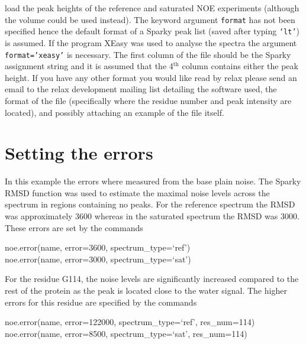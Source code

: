 load the peak heights of the reference and saturated NOE experiments (although the volume could be used instead).  The keyword argument \texttt{format} has not been specified hence the default format of a Sparky peak list (saved after typing \texttt{`lt'}) is assumed.  If the program XEasy was used to analyse the spectra the argument \texttt{format='xeasy'} is necessary.  The first column of the file should be the Sparky assignment string and it is assumed that the 4$^\textrm{th}$ column contains either the peak height.  If you have any other format you would like read by relax please send an email to the relax development mailing list detailing the software used, the format of the file (specifically where the residue number and peak intensity are located), and possibly attaching an example of the file itself.




\section{Setting the errors}

In this example the errors where measured from the base plain noise.  The Sparky RMSD function was used to estimate the maximal noise levels across the spectrum in regions containing no peaks.  For the reference spectrum the RMSD was approximately 3600 whereas in the saturated spectrum the RMSD was 3000.  These errors are set by the commands

\begin{exampleenv}
noe.error(name, error=3600, spectrum\_type=`ref') \\
noe.error(name, error=3000, spectrum\_type=`sat')
\end{exampleenv}

For the residue G114, the noise levels are significantly increased compared to the rest of the protein as the peak is located close to the water signal.  The higher errors for this residue are specified by the commands

\begin{exampleenv}
noe.error(name, error=122000, spectrum\_type=`ref', res\_num=114) \\
noe.error(name, error=8500, spectrum\_type=`sat', res\_num=114)
\end{exampleenv}



